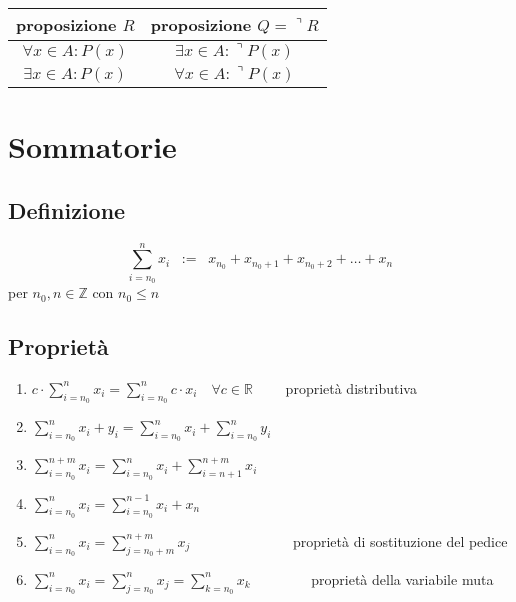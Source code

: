 \documentclass[a4paper]{article}
\begin{document}
\begin{center}
	\begin{tabular}{c c}
		proposizione \(R\) & proposizione \(Q = \urcorner R\) \\
		\toprule
		\(\forall x \in A : P(x)\) & \(\exists x \in A : \urcorner P(x)\) \\
		\midrule
		\(\exists x \in A : P(x)\) & \(\forall x \in A : \urcorner P(x)\) \\
	\end{tabular}
\end{center}

\newpage

\section{Sommatorie}
\subsection{Definizione}
\[\sum_{i = n_0} ^ {n} x_i \;\; := \;\; x_{n_0} + x_{n_0+1} + x_{n_0+2} + \dots + x_n\] per \(n_0, n \in \mathbb{Z}\) con \(n_0 \leq n\)


\subsection{Proprietà}
\begin{enumerate}
	\item \(\displaystyle c \cdot \sum_{i = n_0} ^ {n} x_i = \sum_{i = n_0} ^ {n} c \cdot x_i \quad \forall c \in \mathbb{R} \qquad\) proprietà distributiva
	\item \(\displaystyle \sum_{i = n_0} ^ {n} x_i + y_i = \sum_{i = n_0} ^ {n} x_i + \sum_{i = n_0} ^ {n} y_i\)
	\item \(\displaystyle \sum_{i = n_0} ^ {n + m} x_i = \sum_{i = n_0} ^ {n} x_i + \sum_{i = n + 1} ^ {n + m} x_i\)
	\item \(\displaystyle \sum_{i = n_0} ^ {n} x_i = \sum_{i = n_0} ^ {n-1} x_i + x_n\)
	\item \(\displaystyle \sum_{i = n_0} ^ {n} x_i = \sum_{j = n_0 + m} ^ {n + m} x_j \qquad \qquad \qquad \quad\) proprietà di sostituzione del pedice
	\item \(\displaystyle \sum_{i = n_0} ^ {n} x_i = \sum_{j = n_0} ^ {n} x_j = \sum_{k = n_0} ^ {n} x_k \qquad \qquad\) proprietà della variabile muta
\end{enumerate}
\end{document}
